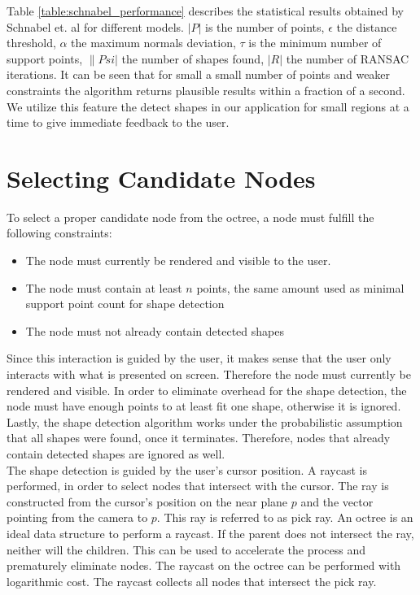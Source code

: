 Table \ref{table:schnabel_performance} describes the statistical results obtained by Schnabel et. al\cite{schnabel-2007-efficient} for different models. $|P|$ is the number of points, $\epsilon$ the distance threshold, $\alpha$ the maximum normals deviation, $\tau$ is the minimum number of support points, $\|Psi|$ the number of shapes found, $|R|$ the number of RANSAC iterations. It can be seen that for small a small number of points and weaker constraints the algorithm returns plausible results within a fraction of a second. We utilize this feature the detect shapes in our application for small regions at a time to give immediate feedback to the user. 


\section{Selecting Candidate Nodes}
\label{sec:candidateNodes}
To select a proper candidate node from the octree, a node must fulfill the following constraints: 
\begin{itemize}
	\item The node must currently be rendered and visible to the user. 
	\item The node must contain at least $n$ points, the same amount used as minimal support point count for shape detection
	\item The node must not already contain detected shapes
\end{itemize}

Since this interaction is guided by the user, it makes sense that the user only interacts with what is presented on screen. Therefore the node must currently be rendered and visible. In order to eliminate overhead for the shape detection, the node must have enough points to at least fit one shape, otherwise it is ignored. Lastly, the shape detection algorithm works under the probabilistic assumption that all shapes were found, once it terminates. Therefore, nodes that already contain detected shapes are ignored as well. 
\\
The shape detection is guided by the user's cursor position. 
A raycast is performed, in order to select nodes that intersect with the cursor. 
The ray is constructed from the cursor's position on the near plane $p$ and the vector pointing from the camera to $p$. This ray is referred to as pick ray. 
An octree is an ideal data structure to perform a raycast. If the parent does not intersect the ray, neither will the children. This can be used to accelerate the process and prematurely eliminate nodes. The raycast on the octree can be performed with logarithmic cost. The raycast collects all nodes that intersect the pick ray. 

